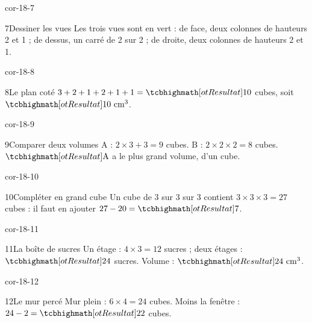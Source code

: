 \begin{blocLivre}{cor-18-7}\begin{corrige}{7}{Dessiner les vues}
Les trois vues sont en vert : de face, deux colonnes de hauteurs 2 et 1 ; de dessus, un carré de 2 sur 2 ; de droite, deux colonnes de hauteurs 2 et 1.
\label{fig-cor-18-7}
\end{corrige}\end{blocLivre}
\begin{blocLivre}{cor-18-8}\begin{corrige}{8}{Le plan coté}
$3+2+1+2+1+1=\res{10}$ cubes, soit $\res{10\ \mathrm{cm}^3}$.
\label{fig-cor-18-8}
\end{corrige}\end{blocLivre}
\begin{blocLivre}{cor-18-9}\begin{corrige}{9}{Comparer deux volumes}
A : $2\times3+3=9$ cubes. B : $2\times2\times2=8$ cubes. $\res{\text{A}}$ a le plus grand volume, d’un cube.
\label{fig-cor-18-9}
\end{corrige}\end{blocLivre}
\begin{blocLivre}{cor-18-10}\begin{corrige}{10}{Compléter en grand cube}
Un cube de 3 sur 3 sur 3 contient $3\times3\times3=27$ cubes : il faut en ajouter $27-20=\res7$.
\label{fig-cor-18-10}
\end{corrige}\end{blocLivre}
\begin{blocLivre}{cor-18-11}\begin{corrige}{11}{La boîte de sucres}
Un étage : $4\times3=12$ sucres ; deux étages : $\res{24}$ sucres. Volume : $\res{24\ \mathrm{cm}^3}$.
\label{fig-cor-18-11}
\end{corrige}\end{blocLivre}
\begin{blocLivre}{cor-18-12}\begin{corrige}{12}{Le mur percé}
Mur plein : $6\times4=24$ cubes. Moins la fenêtre : $24-2=\res{22}$ cubes.
\label{fig-cor-18-12}
\end{corrige}\end{blocLivre}

